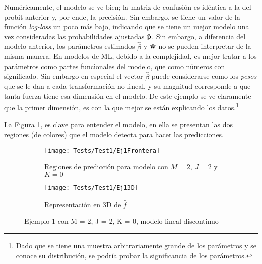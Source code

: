 \documentclass[../Main/Main.tex]{subfiles}
\begin{document}
Numéricamente, el modelo se ve bien; la matriz de confusión es idéntica a la del probit anterior y, por ende, la precisión. Sin embargo, se tiene un valor de la función \textit{log-loss} un poco más bajo, indicando que se tiene un mejor modelo una vez consideradas las probabilidades ajustadas $\hat{\mathbf{p}}$. Sin embargo, a diferencia del modelo anterior, los parámetros estimados $\hat{\beta}$ y $\hat{\mathbf{w}}$ no se pueden interpretar de la misma manera. En modelos de ML, debido a la complejidad, es mejor tratar a los parámetros como partes funcionales del modelo, que como números con significado. Sin embargo en especial el vector $\hat{\beta}$ puede considerarse como los \textit{pesos} que se le dan a cada transformación no lineal, y su magnitud corresponde a que tanta fuerza tiene esa dimensión en el modelo. De este ejemplo se ve claramente que la primer dimensión, es con la que mejor se están explicando los datos.\footnote{Dado que se tiene una muestra arbitrariamente grande de los parámetros y se conoce su distribución, se podría probar la significancia de los parámetros.}

La Figura \ref{fig:Test1Ej1}, es clave para entender el modelo, en ella se presentan las dos regiones (de colores) que el modelo detecta para hacer las predicciones.

\begin{figure}[h]
	\centering
	\begin{subfigure}[b]{0.45\textwidth}
    	\texttt{[image: Tests/Test1/Ej1Frontera]}
		\caption{Regiones de predicción para modelo con $M = 2$, $J = 2$ y $K = 0$}
	\label{fig:Test1Ej1}
	\end{subfigure}
	\hfill    
    \begin{subfigure}[b]{0.45\textwidth}
        \texttt{[image: Tests/Test1/Ej13D]}
        \caption{Representación en 3D de $\hat{f}$}
        \label{fig:Test1Ej13D}
    \end{subfigure}
    \caption{Ejemplo 1 con M = 2, J = 2, K = 0, modelo lineal discontinuo}
\end{figure}
\end{document}
